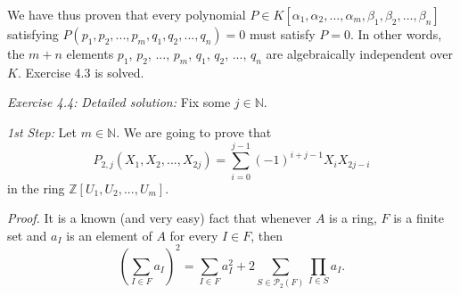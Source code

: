 \documentclass[numbers=enddot,12pt,final,onecolumn,notitlepage]{scrartcl}%
\begin{document}
We have thus proven that every polynomial $P\in K\left[  \alpha_{1},\alpha
_{2},...,\alpha_{m},\beta_{1},\beta_{2},...,\beta_{n}\right]  $ satisfying
$P\left(  p_{1},p_{2},...,p_{m},q_{1},q_{2},...,q_{n}\right)  =0$ must satisfy
$P=0$. In other words, the $m+n$ elements $p_{1}$, $p_{2}$, $...$, $p_{m}$,
$q_{1}$, $q_{2}$, $...$, $q_{n}$ are algebraically independent over $K$.
Exercise 4.3 is solved.

\textit{Exercise 4.4:} \textit{Detailed solution:} Fix some $j\in\mathbb{N}$.

\textit{1st Step:} Let $m\in\mathbb{N}$. We are going to prove that%
\[
P_{2,j}\left(  X_{1},X_{2},...,X_{2j}\right)  =\sum\limits_{i=0}^{j-1}\left(
-1\right)  ^{i+j-1}X_{i}X_{2j-i}%
\]
in the ring $\mathbb{Z}\left[  U_{1},U_{2},...,U_{m}\right]  $.

\textit{Proof.} It is a known (and very easy) fact that whenever $A$ is a
ring, $F$ is a finite set and $a_{I}$ is an element of $A$ for every $I\in F$,
then%
\begin{equation}
\left(  \sum\limits_{I\in F}a_{I}\right)  ^{2}=\sum\limits_{I\in F}a_{I}%
^{2}+2\sum\limits_{S\in\mathcal{P}_{2}\left(  F\right)  }\prod\limits_{I\in
S}a_{I}. \label{4.4.sol.1}%
\end{equation}
\end{document}
